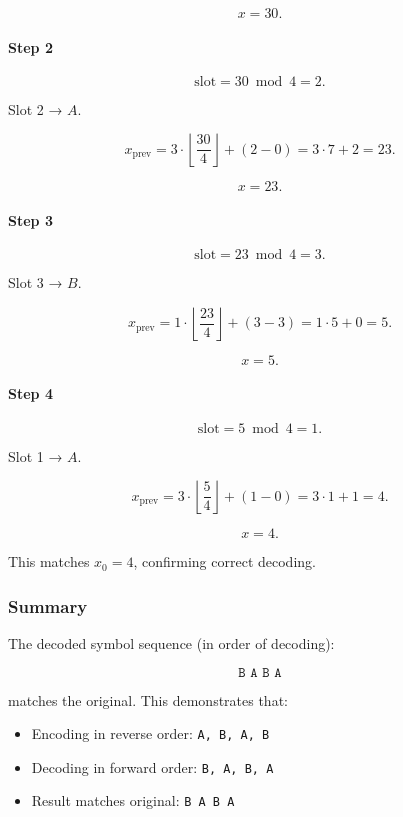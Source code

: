 \[
x = 30.
\]

\paragraph{Step 2}

\[
\text{slot} = 30 \bmod 4 = 2.
\]

Slot 2 → $A$.

\[
x_{\text{prev}} = 3 \cdot \left\lfloor \frac{30}{4} \right\rfloor + (2 - 0) = 3 \cdot 7 + 2 = 23.
\]

\[
x = 23.
\]

\paragraph{Step 3}

\[
\text{slot} = 23 \bmod 4 = 3.
\]

Slot 3 → $B$.

\[
x_{\text{prev}} = 1 \cdot \left\lfloor \frac{23}{4} \right\rfloor + (3 - 3) = 1 \cdot 5 + 0 = 5.
\]

\[
x = 5.
\]

\paragraph{Step 4}

\[
\text{slot} = 5 \bmod 4 = 1.
\]

Slot 1 → $A$.

\[
x_{\text{prev}} = 3 \cdot \left\lfloor \frac{5}{4} \right\rfloor + (1 - 0) = 3 \cdot 1 + 1 = 4.
\]

\[
x = 4.
\]

This matches $x_0 = 4$, confirming correct decoding.

\subsubsection{Summary}

The decoded symbol sequence (in order of decoding):

\[
\boxed{\texttt{B A B A}}
\]

matches the original.  
This demonstrates that:
\begin{itemize}
    \item Encoding in reverse order: \texttt{A, B, A, B}
    \item Decoding in forward order: \texttt{B, A, B, A}
    \item Result matches original: \texttt{B A B A}
\end{itemize}


